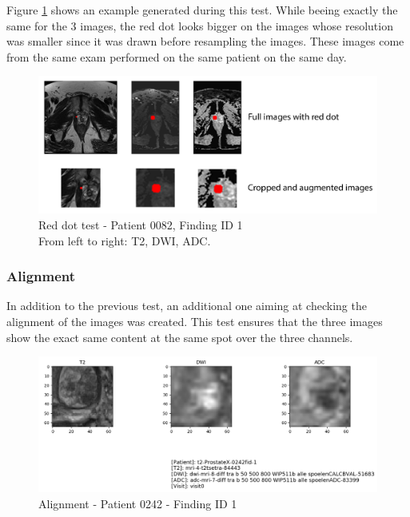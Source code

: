 \noindent Figure \ref{fig:reddot} shows an example generated during this test. While beeing exactly the same for the 3 images, the red dot looks bigger on the images whose resolution was smaller since it was drawn before resampling the images. These images come from the same exam performed on the same patient on the same day. 

\begin{figure}[!h]
\centering
\includegraphics[width=\textwidth, keepaspectratio=true]{./figures/test_red_dot.png}
\caption{Red dot test - Patient 0082, Finding ID 1\\From left to right: T2, DWI, ADC.}
\label{fig:reddot}
\end{figure}


\subsubsection{Alignment}
In addition to the previous test, an additional one aiming at checking the alignment of the images was created. This test ensures that the three images show the exact same content at the same spot over the three channels. 

\begin{figure}[!h]
\centering
\includegraphics[width=\textwidth, keepaspectratio=true]{./figures/alignment.png}
\caption{Alignment - Patient 0242 - Finding ID 1}
\label{fig:alignment}
\end{figure}



